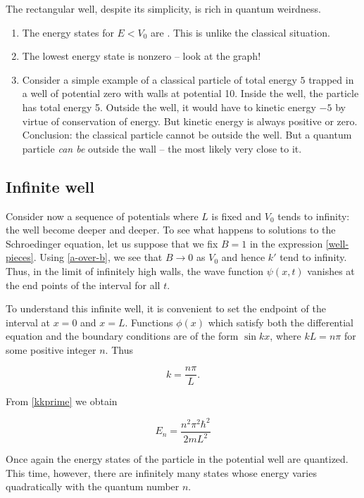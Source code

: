 The rectangular well, despite its simplicity, is rich in quantum weirdness.

\begin{enumerate}
\item The energy states for $E < V_0$ are .  This is unlike the classical situation.
%
\item The lowest energy state is nonzero -- look at the graph!
%
\item Consider a simple example of a classical particle of total energy $5$ trapped in a well of potential zero with walls at potential 10.  Inside the well, the particle has total energy 5.  Outside the well, it would have to kinetic energy $-5$ by virtue of conservation of energy.  But kinetic energy is always positive or zero. Conclusion: the classical particle cannot be outside the well.  But a quantum particle \emph{can be} outside the wall -- the most likely very close to it.
\end{enumerate}

\subsection{Infinite well}

Consider now a sequence of potentials where $L$ is fixed and $V_0$ tends to infinity: the well become deeper and deeper. To see what happens to solutions to the Schroedinger equation, let us suppose that we fix $B = 1$ in the expression \eqref{well-pieces}. Using \eqref{a-over-b}, we see that $B \longrightarrow 0$ as $V_0$ and hence $k'$ tend to infinity.  Thus, in the limit of infinitely high walls, the wave function $\psi(x,t)$ vanishes at the end points of the interval for all $t$.

To understand this infinite well, it is convenient to set the endpoint of the interval at $x = 0$ and $x = L$.  Functions $\phi(x)$ which satisfy both the differential equation and the boundary conditions are of the form $\sin kx$, where $kL = n\pi$ for some positive integer $n$. Thus

\begin{equation}
  k = \frac{n\pi}{L}.
\end{equation}

From \eqref{kkprime} we obtain

\begin{equation}
  E_n = \frac{ n^2 \pi^2 \hbar^2 }{ 2mL^2 }
\end{equation}

Once again the energy states of the particle in the potential well are quantized.  This time, however, there are infinitely many states whose energy varies quadratically with the quantum number $n$.

